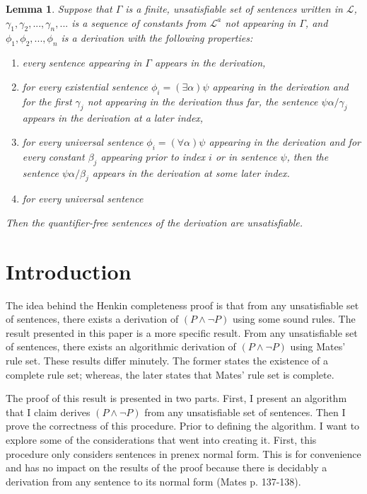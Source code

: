 \documentclass[12pt]{article}
\newtheorem{lemma}[theorem]{Lemma}
\theoremstyle{definition}
\theoremstyle{remark}
\begin{document}
\begin{lemma}
	Suppose that $\Gamma$ is a finite, unsatisfiable set of sentences written in $\mathscr{L}$, $\gamma_1, \gamma_2, ..., \gamma_n, ...$ is a sequence of constants from $\mathscr{L}^a$ not appearing in $\Gamma$, and $\phi_1, \phi_2, ..., \phi_n$ is a derivation with the following properties:
	
	\begin{enumerate}
		\item every sentence appearing in $\Gamma$ appears in the derivation,
		\item for every existential sentence $\phi_i = (\exists \alpha)\psi$ appearing in the derivation and for the first $\gamma_j$ not appearing in the derivation thus far, the sentence $\psi\alpha/\gamma_j$ appears in the derivation at a later index,
		\item for every universal sentence $\phi_i = (\forall \alpha)\psi$ appearing in the derivation and for every constant $\beta_j$ appearing prior to index $i$ or in sentence $\psi$, then the sentence $\psi\alpha/\beta_j$ appears in the derivation at some later index.
		\item for every universal sentence 
	\end{enumerate}
	
	Then the quantifier-free sentences of the derivation are unsatisfiable. 
\end{lemma} 

\section{Introduction}
The idea behind the Henkin completeness proof is that from any unsatisfiable set of sentences, there exists a derivation of $(P \land \neg P)$ using some sound rules. The result presented in this paper is a more specific result. From any unsatisfiable set of sentences, there exists an algorithmic derivation of $(P \land \neg P)$ using Mates' rule set. These results differ minutely. The former states the existence of a complete rule set; whereas, the later states that Mates' rule set is complete.

The proof of this result is presented in two parts. First, I present an algorithm that I claim derives $(P \land \neg P)$ from any unsatisfiable set of sentences. Then I prove the correctness of this procedure. Prior to defining the algorithm. I want to explore some of the considerations that went into creating it. First, this procedure only considers sentences in prenex normal form. This is for convenience and has no impact on the results of the proof because there is decidably a derivation from any sentence to its normal form (Mates p. 137-138).
\end{document}
